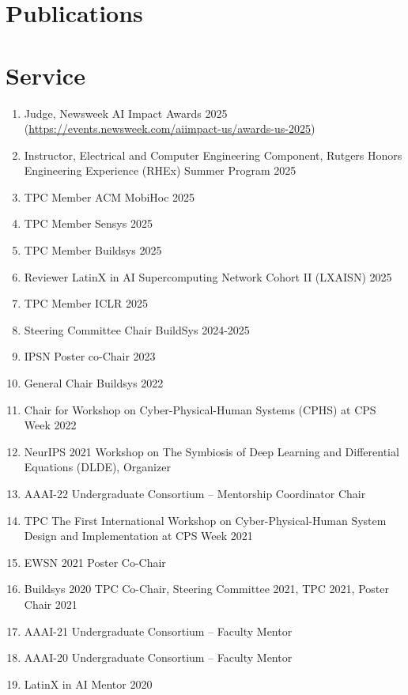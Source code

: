 \documentclass[12pt]{article}
\begin{document}
\section{Publications}


\newpage
\section{Service}
\begin{enumerate}
    \item Judge, Newsweek AI Impact Awards 2025 (\href{https://events.newsweek.com/aiimpact-us/awards-us-2025}{https://events.newsweek.com/aiimpact-us/awards-us-2025})
    \item Instructor, Electrical and Computer Engineering Component, Rutgers Honors Engineering Experience (RHEx) Summer Program 2025
    \item TPC Member ACM MobiHoc 2025
    \item TPC Member Sensys 2025
    \item TPC Member Buildsys 2025
    \item Reviewer LatinX in AI Supercomputing Network Cohort II (LXAISN) 2025
    \item TPC Member ICLR 2025
    \item Steering Committee Chair BuildSys 2024-2025
    \item IPSN Poster co-Chair 2023
    \item General Chair Buildsys 2022
    \item Chair for Workshop on Cyber-Physical-Human Systems (CPHS) at CPS Week 2022
    \item NeurIPS 2021 Workshop on The Symbiosis of Deep Learning and Differential Equations (DLDE), Organizer
    \item AAAI-22 Undergraduate Consortium -- Mentorship Coordinator Chair
    \item TPC The First International Workshop on Cyber-Physical-Human System Design and Implementation at CPS Week 2021
    \item EWSN 2021 Poster Co-Chair
    \item Buildsys 2020 TPC Co-Chair, Steering Committee 2021, TPC 2021, Poster Chair 2021
    \item AAAI-21 Undergraduate Consortium -- Faculty Mentor
    \item AAAI-20 Undergraduate Consortium -- Faculty Mentor
    \item LatinX in AI Mentor 2020

\end{enumerate}
\end{document}
